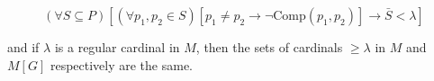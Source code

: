$$(\forall S \subseteq P) [(\forall p_1, p_2 \in S) [p_1 \neq p_2 \rightarrow \neg \text{Comp}(p_1, p_2)] \rightarrow \bar{S} < \lambda]$$

and if $\lambda$ is a regular cardinal in $M$, then the sets of cardinals $\geq \lambda$ in $M$ and $M[G]$ respectively are the same.
